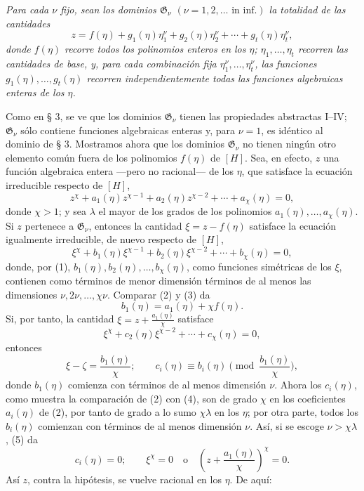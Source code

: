 \emph{Para cada $\nu$ fijo, sean los dominios $\mathfrak G_\nu$ $(\nu=1,2,\ldots\text{ in inf.})$ la totalidad de las cantidades}
\begin{equation}
z=f(\eta)+g_1(\eta)\eta_1^\nu+g_2(\eta)\eta_2^\nu+\cdots+g_t(\eta)\eta_t^\nu,
\tag{1}
\end{equation}
\emph{donde $f(\eta)$ recorre todos los polinomios enteros en los $\eta$; $\eta_1,\ldots,\eta_t$ recorren las cantidades de base, y, para cada combinación fija $\eta_1^\nu,\ldots,\eta_t^\nu$, las funciones $g_1(\eta),\ldots,g_t(\eta)$ recorren independientemente todas las funciones algebraicas enteras de los $\eta$.}

Como en § 3, se ve que los dominios $\mathfrak G_\nu$ tienen las propiedades abstractas I--IV; $\mathfrak G_\nu$ sólo contiene funciones algebraicas enteras y, para $\nu=1$, es idéntico al dominio de § 3. Mostramos ahora que los dominios $\mathfrak G_\nu$ no tienen ningún otro elemento común fuera de los polinomios $f(\eta)$ de $[H]$. Sea, en efecto, $z$ una función algebraica entera ---pero no racional--- de los $\eta$, que satisface la ecuación irreducible respecto de $[H]$,
\begin{equation}
z^\chi+a_1(\eta)z^{\chi-1}+a_2(\eta)z^{\chi-2}+\cdots+a_\chi(\eta)=0,
\tag{2}
\end{equation}
donde $\chi>1$; y sea $\lambda$ el mayor de los grados de los polinomios $a_1(\eta),\ldots,a_\chi(\eta)$. Si $z$ pertenece a $\mathfrak G_\nu$, entonces la cantidad $\xi=z-f(\eta)$ satisface la ecuación igualmente irreducible, de nuevo respecto de $[H]$,
\begin{equation}
\xi^\chi+b_1(\eta)\xi^{\chi-1}+b_2(\eta)\xi^{\chi-2}+\cdots+b_\chi(\eta)=0,
\tag{3}
\end{equation}
donde, por (1), $b_1(\eta),b_2(\eta),\ldots,b_\chi(\eta)$, como funciones simétricas de los $\xi$, contienen como términos de menor dimensión términos de al menos las dimensiones $\nu,2\nu,\ldots,\chi\nu$. Comparar (2) y (3) da
\[
 b_1(\eta)=a_1(\eta)+\chi f(\eta).
\]
Si, por tanto, la cantidad $\xi=z+\frac{a_1(\eta)}{\chi}$ satisface
\begin{equation}
\xi^\chi+c_2(\eta)\xi^{\chi-2}+\cdots+c_\chi(\eta)=0,
\tag{4}
\end{equation}
entonces
\begin{equation}
 \xi-\zeta=\frac{b_1(\eta)}{\chi};
 \qquad
 c_i(\eta)\equiv b_i(\eta)\pmod{\frac{b_1(\eta)}{\chi}},
\tag{5}
\end{equation}
donde $b_1(\eta)$ comienza con términos de al menos dimensión $\nu$. Ahora los $c_i(\eta)$, como muestra la comparación de (2) con (4), son de grado $\chi$ en los coeficientes $a_i(\eta)$ de (2), por tanto de grado a lo sumo $\chi\lambda$ en los $\eta$; por otra parte, todos los $b_i(\eta)$ comienzan con términos de al menos dimensión $\nu$. Así, si se escoge $\nu>\chi\lambda$, (5) da
\[
 c_i(\eta)=0;\qquad
 \xi^\chi=0\quad\text{o}\quad
 \left(z+\frac{a_1(\eta)}{\chi}\right)^\chi=0.
\]
Así $z$, contra la hipótesis, se vuelve racional en los $\eta$. De aquí:

